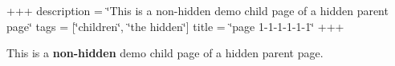 +++ description = \char`\"{}\+This is a non-\/hidden demo child page of a hidden parent page\char`\"{} tags = \mbox{[}\char`\"{}children\char`\"{}, \char`\"{}the hidden\char`\"{}\mbox{]} title = \char`\"{}page 1-\/1-\/1-\/1-\/1-\/1\char`\"{} +++

This is a {\bfseries{non-\/hidden}} demo child page of a hidden parent page. 
